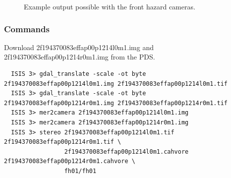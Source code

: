 \begin{figure}[h!]
\centering
  \hfil
\caption{Example output possible with the front hazard cameras.}
\label{fig:metric_example}
\end{figure}

\subsubsection*{Commands}

Download 2f194370083effap00p1214l0m1.img and
2f194370083effap00p1214r0m1.img from the \ac{PDS}.

\begin{verbatim}
  ISIS 3> gdal_translate -scale -ot byte 2f194370083effap00p1214l0m1.img 2f194370083effap00p1214l0m1.tif
  ISIS 3> gdal_translate -scale -ot byte 2f194370083effap00p1214r0m1.img 2f194370083effap00p1214r0m1.tif
  ISIS 3> mer2camera 2f194370083effap00p1214l0m1.img
  ISIS 3> mer2camera 2f194370083effap00p1214r0m1.img
  ISIS 3> stereo 2f194370083effap00p1214l0m1.tif 2f194370083effap00p1214r0m1.tif \
                 2f194370083effap00p1214l0m1.cahvore 2f194370083effap00p1214r0m1.cahvore \
                 fh01/fh01
\end{verbatim}

